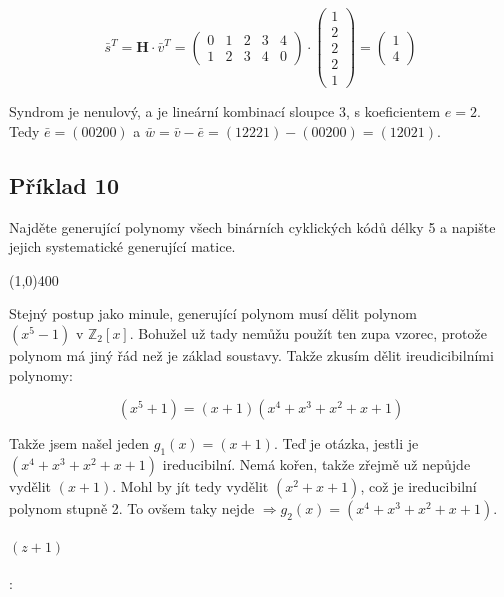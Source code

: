 \documentclass{article}
\begin{document}
\begin{enumerate}
	\[ \bar{s}^T = \mathbf{H}\cdot\bar{v}^T = 
	\begin{pmatrix}
		0 & 1 & 2 & 3 & 4 \\
	  1 & 2 & 3 & 4 & 0
	\end{pmatrix}\cdot
	\begin{pmatrix}
		1\\
	  2\\
	  2\\
	  2\\
	  1
	\end{pmatrix} =  
	\begin{pmatrix}
		1\\
	  4
	\end{pmatrix} \]
\end{enumerate}

Syndrom je nenulový, a je lineární kombinací sloupce 3, s koeficientem $e = 2$. Tedy $\bar{e}=(00200)$ a $\bar{w} = \bar{v} - \bar{e} = (12221) - (00200) = (12021)$. 


\subsection{Příklad 10}
Najděte generující polynomy všech binárních cyklických kódů délky 5 a napište jejich systematické generující matice.

\line(1,0){400}

Stejný postup jako minule, generující polynom musí dělit polynom $(x^5 - 1) \mbox{ v } \mathbb{Z}_2[x]$. Bohužel už tady nemůžu použít ten zupa vzorec, protože polynom má jiný řád než je základ soustavy. Takže zkusím dělit ireudicibilními polynomy:

\[ (x^5 + 1) = (x+1)(x^4 + x^3 + x^2 + x + 1)\]

Takže jsem našel jeden $g_1(x) = (x+1)$. Teď je otázka, jestli je $(x^4 + x^3 + x^2 + x + 1)$ ireducibilní. Nemá kořen, takže zřejmě už nepůjde vydělit $(x+1)$. Mohl by jít tedy vydělit $(x^2 + x + 1)$, což je ireducibilní polynom stupně 2. To ovšem taky nejde $\Rightarrow g_2(x) = (x^4 + x^3 + x^2 + x + 1)$. 

\paragraph {$(z+1)$}:
\end{document}
